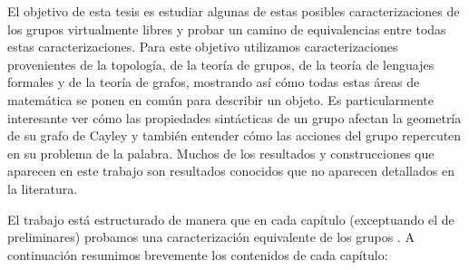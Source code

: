 \documentclass[tesis.tex]{subfiles}
\begin{document}
	El objetivo de esta tesis es estudiar algunas de estas posibles caracterizaciones de los grupos virtualmente libres y probar un camino de equivalencias entre todas estas caracterizaciones.
	Para este objetivo utilizamos caracterizaciones provenientes de la topología, de la teoría de grupos, de la teoría de lenguajes formales y de la teoría de grafos, 
	mostrando así cómo todas estas áreas de matemática se ponen en común para describir un objeto.
	Es particularmente interesante ver cómo las propiedades sintácticas de un grupo afectan la geometría de su grafo de Cayley y  también entender cómo las acciones del grupo repercuten en su problema de la palabra.
	Muchos de los resultados y construcciones que aparecen en este trabajo son resultados conocidos que no aparecen detallados en la literatura.

	El trabajo está estructurado de manera que en cada capítulo (exceptuando el de 
	preliminares) probamos una caracterización equivalente de los grupos \vls.
	A continuación resumimos brevemente los contenidos de cada capítulo:
\end{document}
